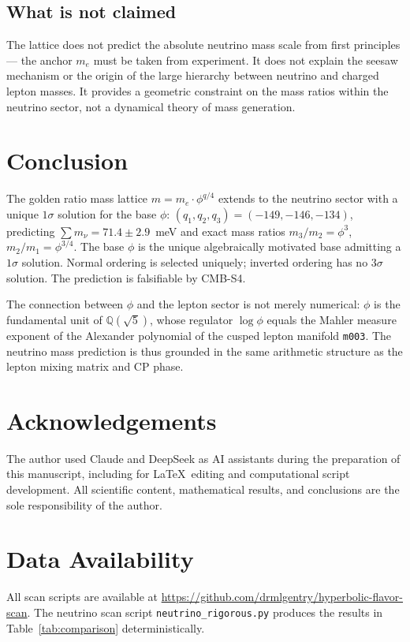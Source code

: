 \documentclass[12pt]{article}
\theoremstyle{definition}
\begin{document}
\subsection{What is not claimed}

The lattice does not predict the absolute neutrino mass scale
from first principles — the anchor $m_e$ must be taken from
experiment. It does not explain the seesaw mechanism or the origin
of the large hierarchy between neutrino and charged lepton masses.
It provides a geometric constraint on the mass ratios within the
neutrino sector, not a dynamical theory of mass generation.

\section{Conclusion}
\label{sec:conclusion}

The golden ratio mass lattice $m = m_e \cdot \phi^{q/4}$ extends
to the neutrino sector with a unique $1\sigma$ solution for the base
$\phi$: $(q_1, q_2, q_3) = (-149, -146, -134)$, predicting
$\sum m_\nu = 71.4 \pm 2.9$~meV and exact mass ratios
$m_3/m_2 = \phi^3$, $m_2/m_1 = \phi^{3/4}$. The base $\phi$ is the
unique algebraically motivated base admitting a $1\sigma$ solution.
Normal ordering is selected uniquely; inverted ordering has no
$3\sigma$ solution. The prediction is falsifiable by CMB-S4.

The connection between $\phi$ and the lepton sector is not merely
numerical: $\phi$ is the fundamental unit of $\mathbb{Q}(\sqrt{5})$,
whose regulator $\log\phi$ equals the Mahler measure exponent of
the Alexander polynomial of the cusped lepton manifold \texttt{m003}.
The neutrino mass prediction is thus grounded in the same arithmetic
structure as the lepton mixing matrix and CP phase.


\section*{Acknowledgements}
The author used Claude and DeepSeek as AI assistants during the
preparation of this manuscript, including for \LaTeX\ editing and
computational script development. All scientific content,
mathematical results, and conclusions are the sole responsibility
of the author.

\section*{Data Availability}
All scan scripts are available at
\url{https://github.com/drmlgentry/hyperbolic-flavor-scan}.
The neutrino scan script \texttt{neutrino\_rigorous.py} produces
the results in Table~\ref{tab:comparison} deterministically.
\end{document}
